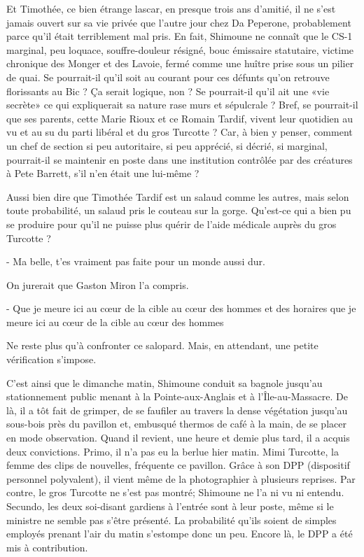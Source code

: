 Et Timothée, ce bien étrange lascar, en presque trois ans d’amitié, il ne s’est jamais ouvert sur sa vie privée que l’autre jour chez Da Peperone, probablement parce qu’il était terriblement mal pris. En fait, Shimoune ne connaît que le CS-1 marginal, peu loquace, souffre-douleur résigné, bouc émissaire statutaire, victime chronique des Monger et des Lavoie, fermé comme une huître prise sous un pilier de quai. Se pourrait-il qu’il soit au courant pour ces défunts qu’on retrouve florissants au Bic ? Ça serait logique, non ? Se pourrait-il qu’il ait une «vie secrète» ce qui expliquerait sa nature rase murs et sépulcrale ? Bref, se pourrait-il que ses parents, cette Marie Rioux et ce Romain Tardif, vivent leur quotidien au vu et au su du parti libéral et du gros Turcotte ? Car, à bien y penser, comment un chef de section si peu autoritaire, si peu apprécié, si décrié, si marginal, pourrait-il se maintenir en poste dans une institution contrôlée par des créatures à Pete Barrett, s’il n’en était une lui-même ?

Aussi bien dire que Timothée Tardif est un salaud comme les autres, mais selon toute probabilité, un salaud pris le couteau sur la gorge. Qu’est-ce qui a bien pu se produire pour qu’il ne puisse plus quérir de l’aide médicale auprès du gros Turcotte ?

- Ma belle, t’es vraiment pas faite pour un monde aussi dur.

On jurerait que Gaston Miron l’a compris.

    - Que je meure ici au cœur de la cible
    au cœur des hommes et des horaires
    que je meure ici au cœur de la cible
    au cœur des hommes

Ne reste plus qu’à confronter ce salopard. Mais, en attendant, une petite vérification s’impose.

C’est ainsi que le dimanche matin, Shimoune conduit sa bagnole jusqu’au stationnement public menant à la Pointe-aux-Anglais et à l’Île-au-Massacre. De là, il a tôt fait de grimper, de se faufiler au travers la dense végétation jusqu’au sous-bois près du pavillon et, embusqué thermos de café à la main, de se placer en mode observation. Quand il revient, une heure et demie plus tard, il a acquis deux convictions. Primo, il n’a pas eu la berlue hier matin. Mimi Turcotte, la femme des clips de nouvelles, fréquente ce pavillon. Grâce à son DPP (dispositif personnel polyvalent), il vient même de la photographier à plusieurs reprises. Par contre, le gros Turcotte ne s’est pas montré; Shimoune ne l’a ni vu ni entendu. Secundo, les deux soi-disant gardiens à l’entrée sont à leur poste, même si le ministre ne semble pas s’être présenté. La probabilité qu’ils soient de simples employés prenant l’air du matin s’estompe donc un peu. Encore là, le DPP a été mis à contribution.

